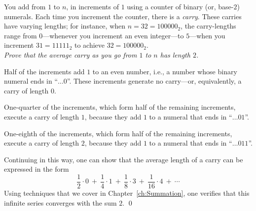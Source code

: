 \medskip

%
You add from $1$ to $n$, in increments of $1$ using a counter of
binary (or, base-$2$) numerals.  Each time you increment the counter,
there is a {\it carry}.  These carries have varying lengths; for
instance, when $n = 32 = 100000_2$, the carry-lengths range
from $0$---whenever you increment an even integer---to $5$---when you
increment $31 = 11111_2$ to achieve $32 = 100000_2$. \\
{\em Prove that the average carry as you go from $1$ to $n$ has length $2$.}
\medskip


\noindent
Half of the increments add $1$ to an even number, i.e., a number whose
binary numeral ends in ``$ \ldots 0$''.  These increments generate no
carry---or, equivalently, a carry of length $0$.

\noindent
One-quarter of the increments, which form half of the remaining
increments, execute a carry of length $1$, because they add $1$ to a
numeral that ends in ``$ \ldots 01$''.

\noindent
One-eighth of the increments, which form half of the remaining
increments, execute a carry of length $2$, because they add $1$ to a
numeral that ends in ``$ \ldots 011$''.

Continuing in this way, one can show that the average length of a
carry can be expressed in the form
\[ 
\frac{1}{2} \cdot 0 \ + \ \frac{1}{4} \cdot 1 \ + \ \frac{1}{8} \cdot
3 \ + \ \frac{1}{16} \cdot 4 \ + \ \cdots
\]
Using techniques that we cover in Chapter~\ref{ch:Summation}, one
verifies that this infinite series converges with the sum $2$.  \qed


